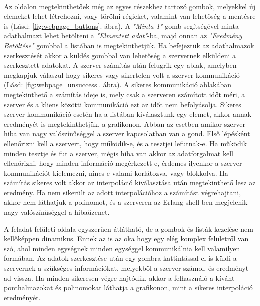 	\paragraph{}
	Az oldalon megtekinthetőek még az egyes részekhez tartozó gombok, melyekkel új elemeket lehet létrehozni, vagy törölni régieket, valamint van lehetőség a mentésre is (Lásd: \ref{fig:webpage_buttons}. ábra).
	A \textit{"Minta 1"} gomb segítségével minta adathalmazt lehet betölteni a \textit{"Elmentett adat"}-ba, majd onnan az \textit{"Eredmény Betöltése"} gombbal a listában is megtekinthetjük. 
	\newline Ha befejeztük az adathalmazok szerkesztését akkor a küldés gombbal van lehetőség a szervernek elküldeni a szerkesztett adatokat.
	\newline 
	A szerver számítás után felugrik egy ablak, amelyben megkapjuk válaszul hogy sikeres vagy sikertelen volt a szerver kommunikáció (Lásd: \ref{fig:webpage_unsuccess}. ábra). 
	\newline
	A sikeres kommunikáció ablakában megtekinthető a számítás ideje is, mely csak a szerveren számított időt méri, a szerver és a kliens közötti kommunikáció ezt az időt nem befolyásolja. \newline
	Sikeres szerver kommunikáció esetén ha a listában kiválasztunk egy elemet, akkor annak eredményét is megtekinthetjük, a grafikonon.
	\newline Abban az esetben amikor szerver hiba van nagy valószínűséggel a szerver kapcsolatban van a gond. Első lépésként ellenőrizni kell a szervert, hogy működik-e, és a tesztjei lefutnak-e. Ha működik minden tesztje és fut a szerver, mégis hiba van akkor az adatforgalmat kell ellenőrizni, hogy minden információ megérkezett-e, érdemes ilyenkor a szerver kommunikációt kielemezni, nincs-e valami korlátozva, vagy blokkolva.
	\newpage
	Ha számítás sikeres volt akkor az interpoláció kiválasztása után megtekinthető lesz az eredmény. Ha nem sikerült az adott interpolációhoz a számítást végrehajtani, akkor nem láthatjuk a polinomot, és a szerveren az Erlang shell-ben megjelenik nagy valószínűséggel a hibaüzenet.

	A feladat felületi oldala egyszerűen átlátható, de a gombok és listák kezelése nem kellőképpen dinamikus. Ennek az is az oka hogy egy elég komplex felületről van szó, ahol minden egységnek minden egységgel kommunikálnia kell valamilyen formában. \newline
	Az adatok szerkesztése után egy gombra kattintással el is küldi a szervernek a szükséges információkat, melyekből a szerver számol, és eredményt ad vissza. \newline
	Ha minden sikeresen végre hajtódik, akkor a felhasználó a kívánt ponthalmazokat és polinomokat láthatja a grafikonon, mint a sikeres interpoláció eredményét.

